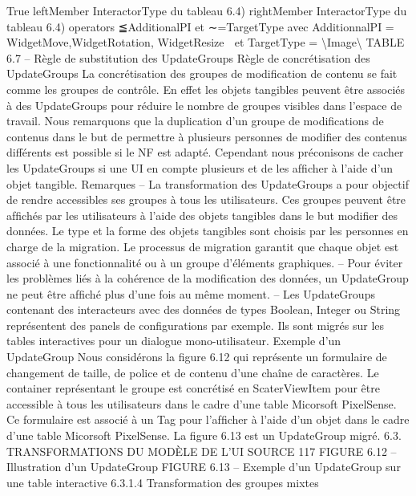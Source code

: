 \documentclass{article}
\begin{document}
True
leftMember
InteractorType du tableau 6.4)
rightMember
InteractorType du tableau 6.4)
operators
≦AdditionalPI et ∼=TargetType
avec AdditionnalPI =
 WidgetMove,WidgetRotation,
WidgetResize

et TargetType = \textbackslash{}{Image\textbackslash{}}
TABLE 6.7 – R\`{e}gle de substitution des UpdateGroups
R\`{e}gle de concr\'{e}tisation des UpdateGroups
La concr\'{e}tisation des groupes de modiﬁcation de
contenu se fait comme les groupes de contr\^{o}le. En effet les objets tangibles peuvent \^{e}tre associ\'{e}s
\`{a} des UpdateGroups pour r\'{e}duire le nombre de groupes visibles dans l’espace de travail.
Nous remarquons que la duplication d’un groupe de modiﬁcations de contenus dans le but de
permettre \`{a} plusieurs personnes de modiﬁer des contenus diff\'{e}rents est possible si le NF est adapt\'{e}.
Cependant nous pr\'{e}conisons de cacher les UpdateGroups si une UI en compte plusieurs et de les
afﬁcher \`{a} l’aide d’un objet tangible.
Remarques
– La transformation des UpdateGroups a pour objectif de rendre accessibles ses groupes \`{a} tous
les utilisateurs. Ces groupes peuvent \^{e}tre afﬁch\'{e}s par les utilisateurs \`{a} l’aide des objets tangibles
dans le but modiﬁer des donn\'{e}es. Le type et la forme des objets tangibles sont choisis par les
personnes en charge de la migration. Le processus de migration garantit que chaque objet est
associ\'{e} \`{a} une fonctionnalit\'{e} ou \`{a} un groupe d’\'{e}l\'{e}ments graphiques.
– Pour \'{e}viter les probl\`{e}mes li\'{e}s \`{a} la coh\'{e}rence de la modiﬁcation des donn\'{e}es, un UpdateGroup
ne peut \^{e}tre afﬁch\'{e} plus d’une fois au m\^{e}me moment.
– Les UpdateGroups contenant des interacteurs avec des donn\'{e}es de types Boolean, Integer ou
String repr\'{e}sentent des panels de conﬁgurations par exemple. Ils sont migr\'{e}s sur les tables
interactives pour un dialogue mono-utilisateur.
Exemple d’un UpdateGroup
Nous consid\'{e}rons la ﬁgure 6.12 qui repr\'{e}sente un formulaire de changement de taille, de police et de contenu d’une cha\^{i}ne de caract\`{e}res. Le container repr\'{e}sentant le
groupe est concr\'{e}tis\'{e} en ScaterViewItem pour \^{e}tre accessible \`{a} tous les utilisateurs dans le cadre
d’une table Micorsoft PixelSense. Ce formulaire est associ\'{e} \`{a} un Tag pour l’afﬁcher \`{a} l’aide d’un
objet dans le cadre d’une table Micorsoft PixelSense. La ﬁgure 6.13 est un UpdateGroup migr\'{e}.
6.3. TRANSFORMATIONS DU MODÈLE DE L’UI SOURCE
117
FIGURE 6.12 – Illustration d’un UpdateGroup
FIGURE 6.13 – Exemple d’un UpdateGroup sur une table interactive
6.3.1.4
Transformation des groupes mixtes
\end{document}
